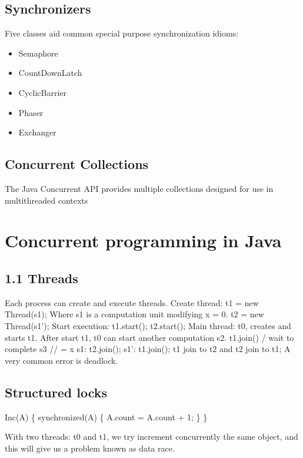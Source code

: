 \documentclass[openany, a4paper]{book}
\theoremstyle{break}
\theoremstyle{example}
\theoremstyle{note}
\theoremstyle{break}
\theoremstyle{exercise}
\begin{document}
\section{Synchronizers}
\label{sec:org665e48d}

Five classes aid common special purpose synchronization idioms:

\begin{itemize}
\item Semaphore
\item CountDownLatch
\item CyclicBarrier
\item Phaser
\item Exchanger
\end{itemize}

\section{Concurrent Collections}
\label{sec:org9dc1c4b}

The Java Concurrent API provides multiple collections designed for use in
multithreaded contexts


\chapter{Concurrent programming in Java}
\label{sec:orge95ed9b}

\section{1.1 Threads}
\label{sec:org837e1e1}
Each process can create and execute threads.
Create thread: t1 = new Thread(s1); Where s1 is a computation unit modifying x
= 0.
t2 = new Thread(s1');
Start execution: t1.start(); t2.start();
Main thread: t0, creates and starts t1. After start t1, t0 can start another
computation s2.
t1.join() / wait to complete
s3 // = x
s1: t2.join();
s1': t1.join();
t1 join to t2 and t2 join to t1;
A very common error is deadlock.

\section{Structured locks}
\label{sec:org8624f28}

Inc(A) \{
  synchronized(A) \{
    A.count = A.count + 1;
  \}
\}

With two threads: t0 and t1, we try increment concurrently the same object,
and this will give us a problem known as data race.
\end{document}

